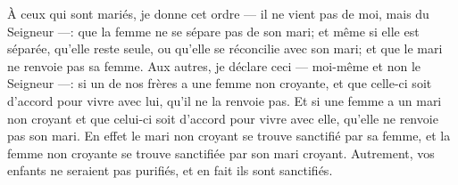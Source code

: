À ceux qui sont mariés, je donne cet ordre
	--- il ne vient pas de moi, mais du Seigneur ---:
	que la femme ne se sépare pas de son mari;
	et même si elle est séparée, qu’elle reste seule,
	ou qu’elle se réconcilie avec son mari;
	et que le mari ne renvoie pas sa femme.
Aux autres, je déclare ceci --- moi-même et non le Seigneur ---:
	si un de nos frères a une femme non croyante,
	et que celle-ci soit d’accord pour vivre avec lui,
	qu’il ne la renvoie pas.
Et si une femme a un mari non croyant
	et que celui-ci soit d’accord pour vivre avec elle,
	qu’elle ne renvoie pas son mari.
En effet le mari non croyant se trouve sanctifié par sa femme,
	et la femme non croyante se trouve sanctifiée par son mari croyant.
Autrement, vos enfants ne seraient pas purifiés,
	et en fait ils sont sanctifiés.
